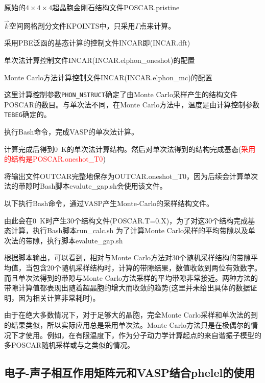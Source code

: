 {原始的$4\times4\times4$超晶胞金刚石结构文件\textrm{POSCAR.pristine}

$\vec k$空间网格剖分文件\textrm{KPOINTS}中，只采用$\Gamma$点来计算。

采用\textrm{PBE}泛函的基态计算的控制文件\textrm{INCAR}即\textrm{(INCAR.dft)}

单次法计算控制文件\textrm{INCAR}\textrm{(INCAR.elphon\_oneshot)}的配置

\textrm{Monte Carlo}方法计算控制文件\textrm{INCAR}\textrm{(INCAR.elphon\_mc)}的配置

这里计算控制参数\texttt{PHON\_NSTRUCT}确定了由\textrm{Monte Carlo}采样产生的结构文件\textrm{POSCAR}的数目。与单次法不同，在\textrm{Monte Carlo}方法中，温度是由计算控制参数\texttt{TEBEG}确定的。

执行\textrm{Bash}命令，完成\textrm{VASP}的单次法计算。

计算完成后得到\textrm{0~K}的单次法计算结构。然后对单次法得到的结构完成基态(\textcolor{red}{采用的结构是\textrm{POSCAR.oneshot\_T0}})

将输出文件\textrm{OUTCAR}完整地保存为\textrm{OUTCAR.oneshot\_T0}，因为后续会计算单次法的带隙时\textrm{Bash}脚本\textrm{evalute\_gap.sh}会使用该文件。

以下执行\textrm{Bash}命令，通过\textrm{VASP}产生\textrm{Monte-Carlo}的采样结构文件。

由此会在\textrm{0~K}时产生30个结构文件(\textrm{POSCAR.T=0.X})，为了对这30个结构完成基态计算，执行\textrm{Bash}脚本\textrm{run\_calc.sh}
为了计算\textrm{Monte Carlo}采样的平均带隙以及单次法的带隙，执行脚本\textrm{evalute\_gap.sh}

根据脚本输出，可以看到，相对与\textrm{Monte Carlo}方法对30个随机采样结构的带隙平均值，当包含20个随机采样结构时，计算的带隙结果，数值收敛到两位有效数字。而且单次法得到的带隙与\textrm{Monte Carlo}方法采样的平均带隙非常接近。两种方法的带隙计算值都表现出随着超晶胞的增大而收敛的趋势(这里并未给出具体的数据证明，因为相关计算非常耗时)。

由于在绝大多数情况下，对于足够大的晶胞，完全\textrm{Monte Carlo}采样和单次法的到的结果类似，所以实际应用总是采用单次法。\textrm{Monte Carlo}方法只是在极偶尔的情况下才使用。例如，在有限温度下，作为分子动力学计算起点的来自谐振子模型的多\textrm{POSCAR}随机采样或与之类似的情况。

\subsection{电子-声子相互作用矩阵元和\rm{VASP}结合\rm{phelel}的使用}
}
